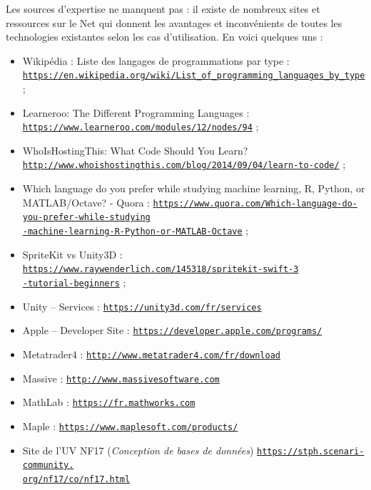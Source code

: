 \documentclass[a4paper,12pt]{article}
\begin{document}
    Les sources d'expertise ne manquent pas : il existe de nombreux sites et ressources sur le Net qui donnent les avantages et inconvénients de toutes les technologies existantes selon les cas d'utilisation. En voici quelques uns :
    \begin{itemize}
        \item Wikipédia : Liste des langages de programmations par type :\\ \href{https://en.wikipedia.org/wiki/List_of_programming_languages_by_type}{\texttt{https://en.wikipedia.org/wiki/List\_of\_programming\_languages\_by\_type}} ;
        \item Learneroo: The Different Programming Languages :\\ \href{https://www.learneroo.com/modules/12/nodes/94}{\texttt{https://www.learneroo.com/modules/12/nodes/94}} ;
        \item WhoIsHostingThis: What Code Should You Learn?\\ \href{http://www.whoishostingthis.com/blog/2014/09/04/learn-to-code/}{\texttt{http://www.whoishostingthis.com/blog/2014/09/04/learn-to-code/}} ;
        \item Which language do you prefer while studying machine learning, R, Python, or MATLAB/Octave? - Quora : \href{https://www.quora.com/Which-language-do-you-prefer-while-studying-machine-learning-R-Python-or-MATLAB-Octave}{\texttt{https://www.quora.com/Which-language-do-you-prefer-while-studying\\-machine-learning-R-Python-or-MATLAB-Octave}} ;
       \item SpriteKit vs Unity3D : \href{https://www.raywenderlich.com/145318/spritekit-swift-3-tutorial-beginners}{\texttt{https://www.raywenderlich.com/145318/spritekit-swift-3\\-tutorial-beginners}} ;
       \item Unity -- Services : \href{https://unity3d.com/fr/services}{\texttt{https://unity3d.com/fr/services}}
       \item Apple -- Developer Site : \href{https://developer.apple.com/programs/}{\texttt{https://developer.apple.com/programs/}}
       \item Metatrader4 : \href{http://www.metatrader4.com/fr/download}{\texttt{http://www.metatrader4.com/fr/download}}
       \item Massive : \href{http://www.massivesoftware.com}{\texttt{http://www.massivesoftware.com}}
       \item MathLab : \href{https://fr.mathworks.com}{\texttt{https://fr.mathworks.com}}
       \item Maple : \href{https://www.maplesoft.com/products/}{\texttt{https://www.maplesoft.com/products/}}
       \item Site de l'UV NF17 (\textit{Conception de bases de données}) \href{https://stph.scenari-community.org/nf17/co/nf17.html}{\texttt{https://stph.scenari-community.\\org/nf17/co/nf17.html}}
                            
    \end{itemize}
\end{document}
